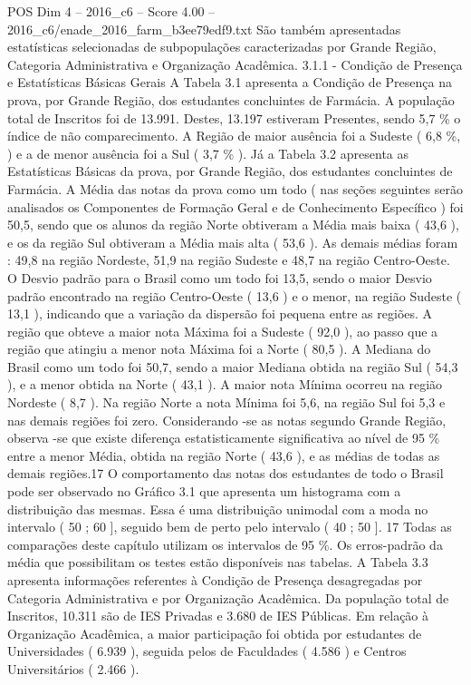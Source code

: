 \begin{textsample}{POS Dim 4 – 2016\_c6 – Score 4.00 – 2016\_c6/enade\_2016\_farm\_b3ee79edf9.txt}
São também apresentadas estatísticas selecionadas de subpopulações caracterizadas por Grande Região, Categoria Administrativa e Organização Acadêmica. 3.1.1 - Condição de Presença e Estatísticas Básicas Gerais A Tabela 3.1 apresenta a Condição de Presença na prova, por Grande Região, dos estudantes concluintes de Farmácia.
A população total de Inscritos foi de 13.991.
Destes, 13.197 estiveram Presentes, sendo 5,7 \% o índice de não comparecimento.
A Região de maior ausência foi a Sudeste ( 6,8 \%, ) e a de menor ausência foi a Sul ( 3,7 \% ).
Já a Tabela 3.2 apresenta as Estatísticas Básicas da prova, por Grande Região, dos estudantes concluintes de Farmácia.
A Média das notas da prova como um todo ( nas seções seguintes serão analisados os Componentes de Formação Geral e de Conhecimento Específico ) foi 50,5, sendo que os alunos da região Norte obtiveram a Média mais baixa ( 43,6 ), e os da região Sul obtiveram a Média mais alta ( 53,6 ).
As demais médias foram : 49,8 na região Nordeste, 51,9 na região Sudeste e 48,7 na região Centro-Oeste.
O Desvio padrão para o Brasil como um todo foi 13,5, sendo o maior Desvio padrão encontrado na região Centro-Oeste ( 13,6 ) e o menor, na região Sudeste ( 13,1 ), indicando que a variação da dispersão foi pequena entre as regiões.
A região que obteve a maior nota Máxima foi a Sudeste ( 92,0 ), ao passo que a região que atingiu a menor nota Máxima foi a Norte ( 80,5 ).
A Mediana do Brasil como um todo foi 50,7, sendo a maior Mediana obtida na região Sul ( 54,3 ), e a menor obtida na Norte ( 43,1 ).
A maior nota Mínima ocorreu na região Nordeste ( 8,7 ).
Na região Norte a nota Mínima foi 5,6, na região Sul foi 5,3 e nas demais regiões foi zero.
Considerando -se as notas segundo Grande Região, observa -se que existe diferença estatisticamente significativa ao nível de 95 \% entre a menor Média, obtida na região Norte ( 43,6 ), e as médias de todas as demais regiões.17 O comportamento das notas dos estudantes de todo o Brasil pode ser observado no Gráfico 3.1 que apresenta um histograma com a distribuição das mesmas.
Essa é uma distribuição unimodal com a moda no intervalo ( 50 ; 60 ], seguido bem de perto pelo intervalo ( 40 ; 50 ]. 17 Todas as comparações deste capítulo utilizam os intervalos de 95 \%.
Os erros-padrão da média que possibilitam os testes estão disponíveis nas tabelas.
A Tabela 3.3 apresenta informações referentes à Condição de Presença desagregadas por Categoria Administrativa e por Organização Acadêmica.
Da população total de Inscritos, 10.311 são de IES Privadas e 3.680 de IES Públicas.
Em relação à Organização Acadêmica, a maior participação foi obtida por estudantes de Universidades ( 6.939 ), seguida pelos de Faculdades ( 4.586 ) e Centros Universitários ( 2.466 ).

\end{textsample}

